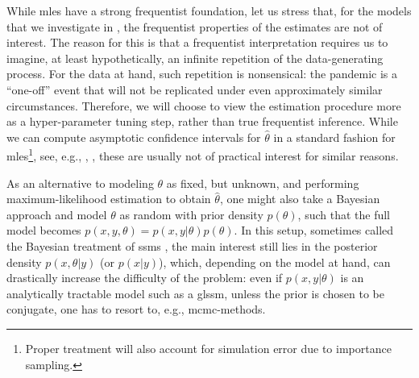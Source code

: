 While \glspl{mle} have a strong frequentist foundation, let us stress that, for the models that we investigate in , the frequentist properties of the estimates are not of interest. The reason for this is that a frequentist interpretation requires us to imagine, at least hypothetically, an infinite repetition of the data-generating process. For the data at hand, such repetition is nonsensical: the pandemic is a ``{}one-off''{} event that will not be replicated under even approximately similar circumstances. Therefore, we will choose to view the estimation procedure more as a hyper-parameter tuning step, rather than true frequentist inference. While we can compute asymptotic confidence intervals for $\hat\theta$ in a standard fashion for \glspl{mle}\footnote{Proper treatment will also account for simulation error due to importance sampling.}, see, e.g., \citep[Chapter 11.6]{Durbin2012Time}, \citep[Chapter 14.8]{Chopin2020Introduction}, these are usually not of practical interest for similar reasons. 

As an alternative to modeling $\theta$ as fixed, but unknown, and performing maximum-likelihood estimation to obtain $\hat \theta$, one might also take a Bayesian approach and model $\theta$ as random with prior density $p(\theta)$, such that the full model becomes $p(x,y,\theta) = p(x,y|\theta)p(\theta)$. In this setup, sometimes called the Bayesian treatment of \glspl{ssm} \citep[Section 13.1]{Durbin2012Time}, the main interest still lies in the posterior density $p(x,\theta|y)$ (or $p(x|y)$), which, depending on the model at hand, can drastically increase the difficulty of the problem: even if $p(x,y|\theta)$ is an analytically tractable model such as a \gls{glssm}, unless the prior is chosen to be conjugate, one has to resort to, e.g., \gls{mcmc}-methods. 

